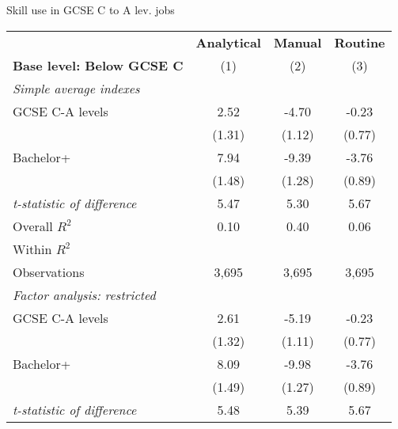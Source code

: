 \begin{center}
\begin{threeparttable}[!h]
\caption{Skill use in GCSE C to A lev. jobs}
\label{tab:skillRegs}
\begin{tabular}{lccc}
\toprule
\toprule
&\multicolumn{1}{c}{\textbf{Analytical}}&\multicolumn{1}{c}{\textbf{Manual}}&\multicolumn{1}{c}{\textbf{Routine}} \\
\textbf{Base level: Below GCSE C}&\multicolumn{1}{c}{(1)}&\multicolumn{1}{c}{(2)}&\multicolumn{1}{c}{(3)} \\
\midrule
\textit{Simple average indexes}\vspace{1mm} \\ 
\hspace{3mm}GCSE C-A levels&        2.52         &       -4.70\sym{***}&       -0.23         \\
                    &      (1.31)         &      (1.12)         &      (0.77)         \\
\hspace{3mm}Bachelor+&        7.94\sym{***}&       -9.39\sym{***}&       -3.76\sym{***}\\
                    &      (1.48)         &      (1.28)         &      (0.89)         \\
\textit{t-statistic of difference}&        5.47         &        5.30         &        5.67         \\
\midrule Overall $ R^2$&        0.10         &        0.40         &        0.06         \\
Within $ R^2$       &                     &                     &                     \\
Observations        &       3,695         &       3,695         &       3,695         \\
\midrule \vspace{1mm}\textit{Factor analysis: restricted} \\ 
\hspace{3mm}GCSE C-A levels&        2.61\sym{*}  &       -5.19\sym{***}&       -0.23         \\
                    &      (1.32)         &      (1.11)         &      (0.77)         \\
\hspace{3mm}Bachelor+&        8.09\sym{***}&       -9.98\sym{***}&       -3.76\sym{***}\\
                    &      (1.49)         &      (1.27)         &      (0.89)         \\
\textit{t-statistic of difference}&        5.48         &        5.39         &        5.67         \\

\end{tabular}
\end{threeparttable}
\end{center}

